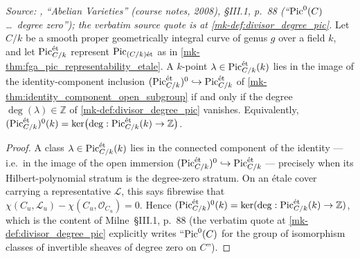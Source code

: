 \begin{theorem}\label{mk-thm:pic_zero_k_points_iff_degree_zero}
  \notready
  \textit{Source: \cite{milne-av}, ``Abelian Varieties'' (course notes, 2008),
  \S III.1, p.~88 (``\(\operatorname{Pic}^0(C)\)\dots\ degree zero''); the verbatim
  source quote is at \ref{mk-def:divisor_degree_pic}.}
  Let \(C/k\) be a smooth proper geometrically integral curve of genus
  \(g\) over a field \(k\), and let \(\operatorname{Pic}^{\mathrm{\acute{e}t}}_{C/k}\) represent
  \(\operatorname{Pic}_{(C/k)\mathrm{\acute{e}t}}\) as in \ref{mk-thm:fga_pic_representability_etale}. A
  \(k\)-point \(\lambda \in \operatorname{Pic}^{\mathrm{\acute{e}t}}_{C/k}(k)\) lies in the image of the
  identity-component inclusion
  \((\operatorname{Pic}^{\mathrm{\acute{e}t}}_{C/k})^0\hookrightarrow\operatorname{Pic}^{\mathrm{\acute{e}t}}_{C/k}\)
  of \ref{mk-thm:identity_component_open_subgroup}
  if and only if the degree
  \(\deg(\lambda) \in \mathbb{Z}\) of \ref{mk-def:divisor_degree_pic}
  vanishes. Equivalently,
  \((\operatorname{Pic}^{\mathrm{\acute{e}t}}_{C/k})^0(k)
    =\ker\bigl(\deg:\operatorname{Pic}^{\mathrm{\acute{e}t}}_{C/k}(k)\to\mathbb Z\bigr)\).
\end{theorem}

\begin{proof}
  A class
  \(\lambda \in \operatorname{Pic}^{\mathrm{\acute{e}t}}_{C/k}(k)\) lies in the connected component of
  the identity --- i.e.\ in the image of the open immersion
  \((\operatorname{Pic}^{\mathrm{\acute{e}t}}_{C/k})^0\hookrightarrow\operatorname{Pic}^{\mathrm{\acute{e}t}}_{C/k}\) --- precisely
  when its Hilbert-polynomial stratum is the degree-zero stratum.
  On an \'etale cover carrying a representative \(\mathcal L\), this says
  fibrewise that
  \(\chi(C_u,\mathcal L_u)-\chi(C_u,\mathcal O_{C_u})=0\).
  Hence
  \((\operatorname{Pic}^{\mathrm{\acute{e}t}}_{C/k})^0(k)
    =\ker(\deg:\operatorname{Pic}^{\mathrm{\acute{e}t}}_{C/k}(k)\to\mathbb Z)\),
  which is the content of Milne~\S III.1, p.~88 (the verbatim quote
  at \ref{mk-def:divisor_degree_pic} explicitly writes ``\(\operatorname{Pic}^0(C)\)
  for the group of isomorphism classes of invertible sheaves of degree
  zero on \(C\)'').
\end{proof}
